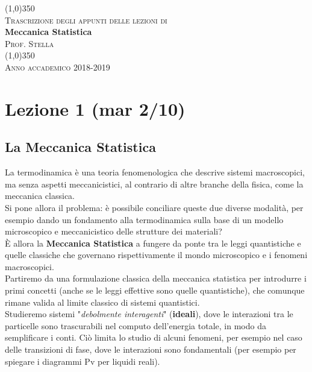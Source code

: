 \documentclass[12pt]{article}
\begin{document}
\setlength{\aboverulesep}{0pt}
\setlength{\belowrulesep}{0pt}
\setlength{\extrarowheight}{.75ex}
\begin{center}
		\line (1,0){350} \\
		\textsc{\normalsize Trascrizione degli appunti delle lezioni di}\\
		[0.25in]
		\huge{\bfseries Meccanica Statistica}\\
		[2mm]
		\textsc{\normalsize Prof. Stella}\\
		\line (1,0){350} \\
		[0.5cm]
		\textsc{\normalsize Anno accademico 2018-2019}\\ 

	\end{center}


\makeatletter
\renewcommand{\@marginparreset}{%
  \reset@font\small
  \raggedright
  \slshape
  \@setminipage
}
\makeatother



\section{Lezione 1 (mar 2/10)}
\subsection{La Meccanica Statistica}
La termodinamica è una teoria fenomenologica che descrive sistemi macroscopici, ma senza aspetti meccanicistici, al contrario di altre branche della fisica, come la meccanica classica.\\ Si pone allora il problema: è possibile conciliare queste due diverse modalità, per esempio dando un fondamento alla termodinamica sulla base di un modello microscopico e meccanicistico delle strutture dei materiali?\\
È allora la \textbf{Meccanica Statistica} a fungere da ponte tra le leggi quantistiche e quelle classiche che governano rispettivamente il mondo microscopico e i fenomeni macroscopici.\\
Partiremo da una formulazione classica della meccanica statistica per introdurre i primi concetti (anche se le leggi effettive sono quelle quantistiche), che comunque rimane valida al limite classico di sistemi quantistici.\\
Studieremo sistemi "\textit{debolmente interagenti}" (\textbf{ideali}), dove le interazioni tra le particelle sono trascurabili nel computo dell'energia totale, in modo da semplificare i conti. Ciò limita lo studio di alcuni fenomeni, per esempio nel caso delle transizioni di fase, dove le interazioni sono fondamentali (per esempio per spiegare i diagrammi Pv per liquidi reali).
\end{document}
